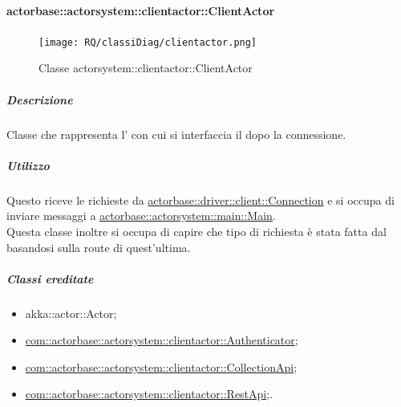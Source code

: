 \documentclass{scalatekids-article}
\begin{document}
\paragraph{actorbase::actorsystem::clientactor::ClientActor}
\label{sec:actorbase::actorsystem::clientactor::ClientActor}

\begin{figure}[H]
  \begin{center}
    \texttt{[image: RQ/classiDiag/clientactor.png]}
    \caption{Classe actorsystem::clientactor::ClientActor}
  \end{center}
\end{figure}

\subparagraph{Descrizione}

Classe che rappresenta l' con cui si interfaccia il  dopo
la connessione.

\subparagraph{Utilizzo}

Questo  riceve le richieste da \hyperref[sec:actorbase::driver::client::Connection]{actorbase::driver::client::Connection}
e si occupa di inviare messaggi a \hyperref[sec:actorbase::actorsystem::main::Main]{actorbase::actorsystem::main::Main}. \\
Questa classe inoltre si occupa di capire che tipo di richiesta è stata fatta dal  basandosi sulla route di quest'ultima.

\subparagraph{Classi ereditate}

\begin{itemize}

\item akka::actor::Actor;
\item \hyperref[com::actorbase::actorsystem::clientactor::Authenticator]{com::actorbase::actorsystem::clientactor::Authenticator};
\item \hyperref[com::actorbase::actorsystem::clientactor::CollectionApi]{com::actorbase::actorsystem::clientactor::CollectionApi};
\item \hyperref[com::actorbase::actorsystem::clientactor::RestApi]{com::actorbase::actorsystem::clientactor::RestApi};.

\end{itemize}
\end{document}
